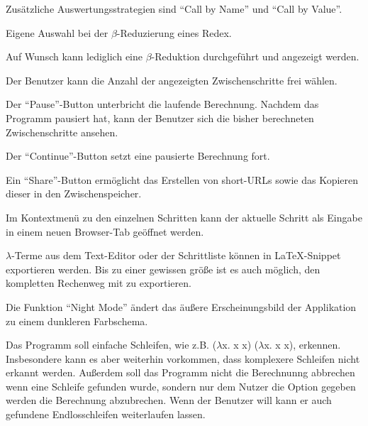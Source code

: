 \documentclass[parskip=full,11pt,twoside]{scrartcl}
\begin{document}
Zusätzliche Auswertungsstrategien sind \enquote{Call by Name} und \enquote{Call by Value}.

Eigene Auswahl bei der $\beta$-Reduzierung eines Redex.

Auf Wunsch kann lediglich eine $\beta$-Reduktion durchgeführt und angezeigt werden.

Der Benutzer kann die Anzahl der angezeigten Zwischenschritte frei wählen.

Der \enquote{Pause}-Button unterbricht die laufende Berechnung. Nachdem das Programm pausiert hat, kann der Benutzer sich die bisher berechneten Zwischenschritte ansehen.

Der \enquote{Continue}-Button setzt eine pausierte Berechnung fort.

Ein \enquote{Share}-Button ermöglicht das Erstellen von short-URLs sowie das Kopieren dieser in den Zwischenspeicher.

Im Kontextmenü zu den einzelnen Schritten kann der aktuelle Schritt als Eingabe in einem neuen Browser-Tab geöffnet werden.

$\lambda$-Terme aus dem Text-Editor oder der Schrittliste können in LaTeX-Snippet exportieren werden. Bis zu einer gewissen größe ist es auch möglich, den kompletten Rechenweg mit zu exportieren.

Die Funktion \enquote{Night Mode} ändert das äußere Erscheinungsbild der Applikation zu einem dunkleren Farbschema.

Das Programm soll einfache Schleifen, wie z.B. ($\lambda$x. x x) ($\lambda$x. x x), erkennen. Insbesondere kann es aber weiterhin vorkommen, dass komplexere Schleifen nicht erkannt werden.
Außerdem soll das Programm nicht die Berechnunng abbrechen wenn eine Schleife gefunden wurde, sondern nur dem Nutzer die Option gegeben werden die Berechnung abzubrechen. Wenn der Benutzer  will kann er auch gefundene Endlosschleifen weiterlaufen lassen.
\end{document}
